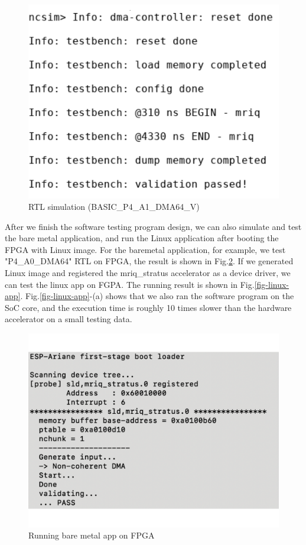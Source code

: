 \begin{figure}[ht]
\centering
\captionsetup{justification=centering, format=hang}
\includegraphics[width=0.75\columnwidth]{figures/debug-sim-A1-4-4-2-2}
\caption{RTL simulation (BASIC\_P4\_A1\_DMA64\_V)}
\label{fig-3}
\end{figure}

After we finish the software testing program design, we can also simulate and
test the bare metal application, and run the Linux application after booting the
FPGA with Linux image. For the baremetal application, for example, we test
"P4\_A0\_DMA64" RTL on FPGA, the result is shown in Fig.\ref{fig-barec-app}. If
we generated Linux image and registered the mriq\_stratus accelerator as a
device driver, we can test the linux app on FGPA. The running result is shown in
Fig.\ref{fig-linux-app}. Fig.\ref{fig-linux-app}-(a) shows that we also ran the
software program on the SoC core, and the execution time is roughly 10 times
slower than the hardware accelerator on a small testing data.

\begin{figure}[t]
\centering
\captionsetup{justification=centering, format=hang}
\includegraphics[width=\columnwidth]{figures/barec-fpga}
\caption{Running bare metal app on FPGA}
\label{fig-barec-app}
\end{figure}

